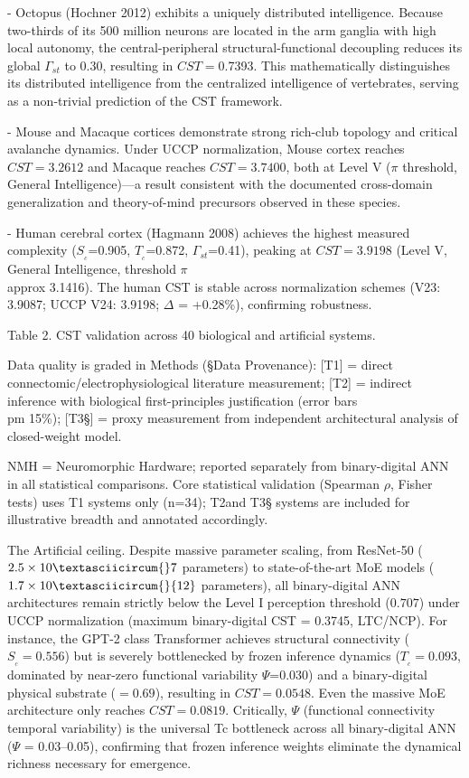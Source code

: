 \documentclass[a4paper,12pt]{article}
\begin{document}
- Octopus (Hochner 2012) exhibits a uniquely distributed intelligence. Because two-thirds of its 500 million neurons are located in the arm ganglia with high local autonomy, the central-peripheral structural-functional decoupling reduces its global $\Gamma_{st}$ to 0.30, resulting in $CST = $0.7393. This mathematically distinguishes its distributed intelligence from the centralized intelligence of vertebrates, serving as a non-trivial prediction of the CST framework.


- Mouse and Macaque cortices demonstrate strong rich-club topology and critical avalanche dynamics. Under UCCP normalization, Mouse cortex reaches $CST = 3.2612$ and Macaque reaches $CST = 3.7400$, both at Level V ($\pi$ threshold, General Intelligence)---a result consistent with the documented cross-domain generalization and theory-of-mind precursors observed in these species.


- Human cerebral cortex (Hagmann 2008) achieves the highest measured complexity ($S_{_c}$=0.905, $T_{_c}$=0.872, $\Gamma_{st}$=0.41), peaking at $CST = 3.9198$ (Level V, General Intelligence, threshold $\pi$  \\approx  3.1416). The human CST is stable across normalization schemes (V23: 3.9087; UCCP V24: 3.9198; $\Delta$ = +0.28\%), confirming robustness.


Table 2. CST validation across 40 biological and artificial systems.


Data quality is graded in Methods (\S{}Data Provenance): [T1] = direct connectomic/electrophysiological literature measurement; [T2\dag] = indirect inference with biological first-principles justification (error bars  \\pm 15\%); [T3\S{}] = proxy measurement from independent architectural analysis of closed-weight model.


\dag{}NMH = Neuromorphic Hardware; reported separately from binary-digital ANN in all statistical comparisons. Core statistical validation (Spearman $\rho$, Fisher tests) uses T1 systems only (n=34); T2\dag and T3\S{} systems are included for illustrative breadth and annotated accordingly.


The Artificial ceiling. Despite massive parameter scaling, from ResNet-50 ($2.5 \times 10\textasciicircum{}7$ parameters) to state-of-the-art MoE models ($1.7 \times 10\textasciicircum{}{12}$ parameters), all binary-digital ANN architectures remain strictly below the Level I perception threshold ($0.707$) under UCCP normalization (maximum binary-digital CST = 0.3745, LTC/NCP). For instance, the GPT-2 class Transformer achieves structural connectivity ($S_{_c}=0.556$) but is severely bottlenecked by frozen inference dynamics ($T_{_c}=0.093$, dominated by near-zero functional variability $\Psi$=0.030) and a binary-digital physical substrate (\alpha$=0.69$), resulting in $CST = 0.0548$. Even the massive MoE architecture only reaches $CST = 0.0819$. Critically, $\Psi$ (functional connectivity temporal variability) is the universal Tc bottleneck across all binary-digital ANN ($\Psi$ = 0.03--0.05), confirming that frozen inference weights eliminate the dynamical richness necessary for emergence.
\end{document}
